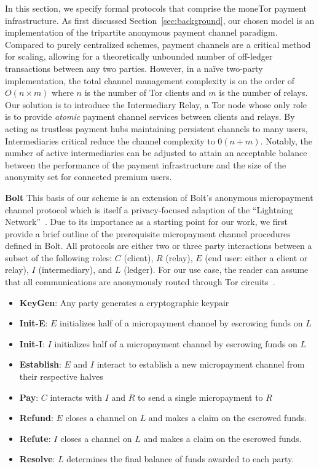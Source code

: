 In this section, we specify formal protocols that comprise the moneTor payment infrastructure.
As first discussed Section~\ref{sec:background}, our chosen model is an implementation of the tripartite anonymous payment channel paradigm.
Compared to purely centralized schemes, payment channels are a critical method for scaling, allowing for a theoretically unbounded number of off-ledger transactions between any two parties.
However, in a na\"{i}ve two-party implementation, the total channel management complexity is on the order of $O(n \times m)$ where $n$ is the number of Tor clients and $m$ is the number of relays.
Our solution is to introduce the Intermediary Relay, a Tor node whose only role is to provide \emph{atomic} payment channel services between clients and relays.
By acting as trustless payment hubs maintaining persistent channels to many users, Intermediaries critical reduce the channel complexity to $0(n+m)$.
Notably, the number of active intermediaries can be adjusted to attain an acceptable balance between the performance of the payment infrastructure and the size of the anonymity set for connected premium users.

\medskip \noindent\textbf{Bolt} This basis of our scheme is an extension of Bolt's anonymous micropayment channel protocol which is itself a privacy-focused adaption of the ``Lightning Network''~\cite{poon2016bitcoin}.
Due to its importance as a starting point for our work, we first provide a brief outline of the prerequisite micropayment channel procedures defined in Bolt.
All protocols are either two or three party interactions between a subset of the following roles: $C$ (client), $R$ (relay), $E$ (end user: either a client or relay), $I$ (intermediary), and $L$ (ledger).
For our use case, the reader can assume that all communications are anonymously routed through Tor circuits~\cite{green2017bolt}.

\begin{itemize}
\item \textbf{KeyGen}: Any party generates a cryptographic keypair
\item \textbf{Init-E}: $E$ initializes half of a micropayment channel by
  escrowing funds on $L$
\item \textbf{Init-I}: $I$ initializes half of a micropayment channel by
  escrowing funds on $L$
\item \textbf{Establish}: $E$ and $I$ interact to establish a new micropayment
  channel from their respective halves
\item \textbf{Pay}: $C$ interacts with $I$ and $R$ to send a single micropayment to $R$
\item \textbf{Refund}: $E$ closes a channel on $L$ and makes a claim on
  the escrowed funds.
\item \textbf{Refute}: $I$ closes a channel on $L$ and makes a claim on
  the escrowed funds.
\item \textbf{Resolve}: $L$ determines the final balance of funds awarded to
  each party.
\end{itemize}

